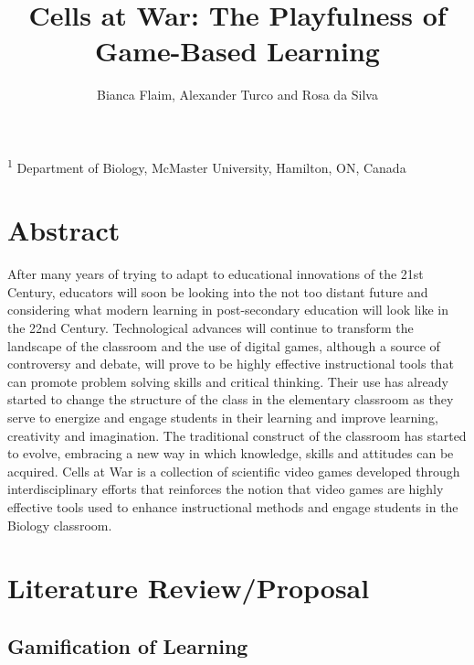 \documentclass{article}
\title{\sc Cells at War: The Playfulness of Game-Based Learning}
\author{\sc Bianca Flaim, Alexander Turco and Rosa da Silva}
\begin{document}

\onecolumn
                        \maketitle

\thispagestyle{empty}
\noindent \textsuperscript{1} Department of Biology, McMaster University, Hamilton, ON, Canada

\newpage
\tableofcontents
\newpage

\section{Abstract}

After many years of trying to adapt to educational innovations of the 21st Century, educators will soon be looking into the not too distant future and considering what modern learning in post-secondary education will look like in the 22nd Century. Technological advances will continue to transform the landscape of the classroom and the use of digital games, although a source of controversy and debate, will prove to be highly effective instructional tools that can promote problem solving skills and critical thinking. Their use has already started to change the structure of the class in the elementary classroom as they serve to energize and engage students in their learning and improve learning, creativity and imagination. The traditional construct of the classroom has started to evolve, embracing a new way in which knowledge, skills and attitudes can be acquired. Cells at War is a collection of scientific video games developed through interdisciplinary efforts that reinforces the notion that video games are highly effective tools used to enhance instructional methods and engage students in the Biology classroom.

\newpage
       
\section{Literature Review/Proposal}

\subsection{Gamification of Learning}
\end{document}

